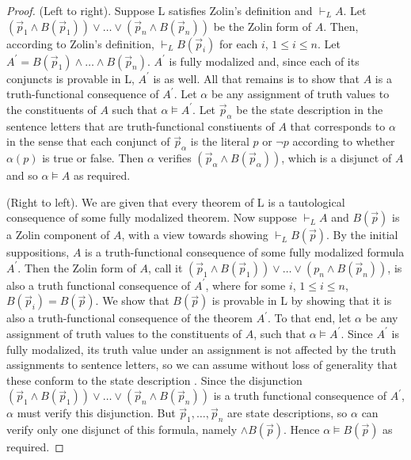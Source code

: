 \documentclass[11pt]{article}
\begin{document}
\begin{proof}
(Left to right). Suppose L satisfies Zolin's definition and $\vdash_L A$. Let $(\vec{p}_1\wedge B(\vec{p}_1))\vee {\ldots}\vee (\vec{p}_n\wedge B(\vec{p}_n))$ be the Zolin form of $A$. Then, according to Zolin's definition, $\vdash_L B(\vec{p}_i)$ for each $i$, $1\le i\le n$. Let $A^\prime = B(\vec{p}_1)\wedge {\ldots}\wedge B(\vec{p}_n)$. $A^\prime$ is fully modalized and, since each of its conjuncts is provable in L, $A^\prime$ is as well. All that remains is to show that $A$ is a truth-functional consequence of $A^\prime$. Let $\alpha$ be any assignment of truth values to the constituents of $A$ such that $\alpha\models A^\prime$. Let $\vec{p}_\alpha$ be the state description in the sentence letters that are truth-functional constiuents of $A$ that corresponds to $\alpha$ in the sense that each conjunct of $\vec{p}_\alpha$ is the literal $p$ or $\neg p$ according to whether $\alpha(p)$ is true or false. Then $\alpha$ verifies $(\vec{p}_\alpha \wedge B(\vec{p}_\alpha))$, which is a disjunct of $A$ and so $\alpha\models A$ as required.

(Right to left). We are given that every theorem of L is a tautological consequence of some fully modalized theorem. Now suppose $\vdash_L A$ and $B(\vec{p})$ is a Zolin component of $A$, with a view towards showing $\vdash_L B(\vec{p})$. By the initial suppositions, $A$ is a truth-functional consequence of some fully modalized formula $A^\prime$. Then the Zolin form of $A$, call it $(\vec{p}_1\wedge B(\vec{p}_1))\vee {\ldots}\vee (p_n\wedge B(\vec{p}_n))$, is also a truth functional consequence of $A^\prime$, where for some $i$, $1\le i\le n$, $B(\vec{p}_i)=B(\vec{p})$. We show that $B(\vec{p})$ is provable in L by showing that it is also a truth-functional consequence of the theorem $A^\prime$. To that end, let $\alpha$ be any assignment of truth values to the constituents of $A$, such that $\alpha\models A^\prime$. Since $A^\prime$ is fully modalized, its truth value under an assignment is not affected by the truth assignments to sentence letters, so we can assume without loss of generality that these conform to the state description . Since the disjunction $(\vec{p}_1\wedge B(\vec{p}_1))\vee {\ldots}\vee (\vec{p}_n\wedge B(\vec{p}_n))$ is a truth functional consequence of $A^\prime$, $\alpha$ must verify this disjunction. But $\vec{p}_1,{\ldots},\vec{p}_n$ are state descriptions, so $\alpha$ can verify only one disjunct of this formula, namely $\wedge B(\vec{p})$. Hence $\alpha\models B(\vec{p})$ as required.
\end{proof}
\end{document}
